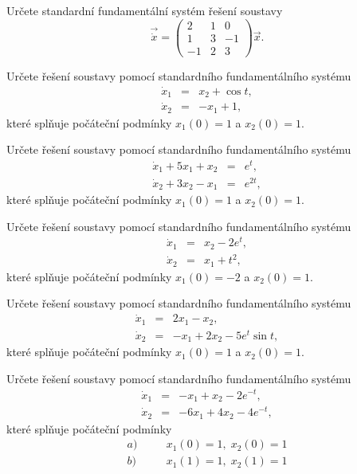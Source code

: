 \documentclass[a4paper,10pt]{book}
\begin{document}
\exercise \label{ex:ode2} Určete standardní fundamentální systém řešení soustavy
\begin{equation*}
\vec{\dot{x}} = \begin{pmatrix} 2 & 1 & 0 \\ 1 & 3 & -1 \\ -1 & 2 & 3 \end{pmatrix} \vec{x}.
\end{equation*}

\exercise \label{ex:ode3} Určete řešení soustavy pomocí standardního fundamentálního systému
\begin{eqnarray*}
\dot{x}_1 &=& x_2  + \cos t, \\
\dot{x}_2 &=& -x_1 + 1, 
\end{eqnarray*}
které splňuje počáteční podmínky $x_1(0)=1$ a $x_2(0)=1$.

\exercise \label{ex:ode4} Určete řešení soustavy pomocí standardního fundamentálního systému
\begin{eqnarray*}
\dot{x}_1 + 5x_1 + x_2 &=& e^t  ,\\
\dot{x}_2 + 3x_2 - x_1 &=& e^{2t} ,
\end{eqnarray*}
které splňuje počáteční podmínky $x_1(0)=1$ a $x_2(0)=1$.

\exercise \label{ex:ode5} Určete řešení soustavy pomocí standardního fundamentálního systému
\begin{eqnarray*}
\dot{x}_1 &=& x_2 - 2e^t ,\\
\dot{x}_2 &=& x_1 + t^2  ,
\end{eqnarray*}
které splňuje počáteční podmínky $x_1(0)=-2$ a $x_2(0)=1$.

\exercise \label{ex:ode6} Určete řešení soustavy pomocí standardního fundamentálního systému
\begin{eqnarray*}
\dot{x}_1 &=& 2x_1 - x_2 ,\\
\dot{x}_2 &=& -x_1 + 2x_2 - 5e^t \sin t ,
\end{eqnarray*}
které splňuje počáteční podmínky $x_1(0)=1$ a $x_2(0)=1$.

\exercise \label{ex:ode7} Určete řešení soustavy pomocí standardního fundamentálního systému
\begin{eqnarray*}
\dot{x}_1 &=& -x_1 + x_2 -2e^{-t},\\
\dot{x}_2 &=& -6x_1 + 4x_2 - 4e^{-t},
\end{eqnarray*}
které splňuje počáteční podmínky 
\begin{eqnarray*}
  a)&\quad& x_1(0)=1,\; x_2(0)=1 \\
  b)&\quad& x_1(1)=1,\; x_2(1)=1 
\end{eqnarray*}
\end{document}
